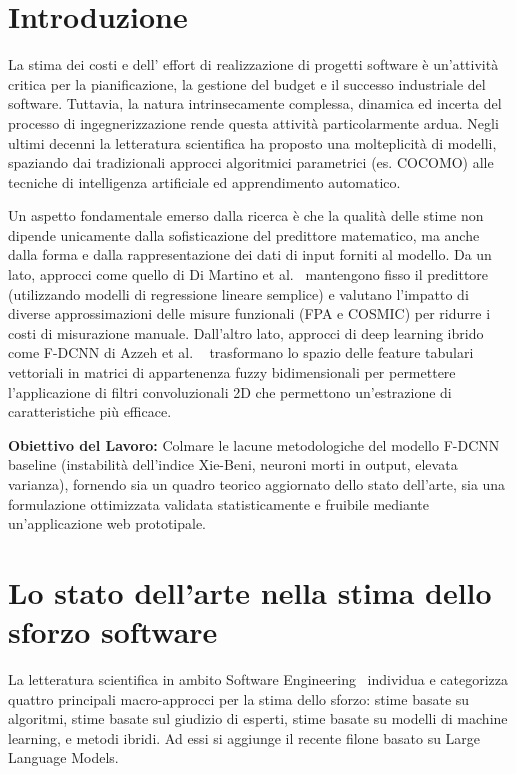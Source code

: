 \documentclass[11pt, a4paper]{article}
\begin{document}
\vspace{1em}

\section{Introduzione}
La stima dei costi e dell' effort di realizzazione di progetti software è
un'attività critica per la pianificazione, la gestione del budget e il successo
industriale del software. Tuttavia, la natura intrinsecamente complessa,
dinamica ed incerta del processo di ingegnerizzazione rende questa attività
particolarmente ardua. Negli ultimi decenni la letteratura scientifica ha
proposto una molteplicità di modelli, spaziando dai tradizionali approcci
algoritmici parametrici (es. COCOMO) alle tecniche di intelligenza artificiale
ed apprendimento automatico.

Un aspetto fondamentale emerso dalla ricerca è che la qualità delle stime non
dipende unicamente dalla sofisticazione del predittore matematico, ma anche
dalla forma e dalla rappresentazione dei dati di input forniti al modello. Da
un lato, approcci come quello di Di Martino et al.~\cite{DIMARTINO2020106308}
mantengono fisso il predittore (utilizzando modelli di regressione lineare
semplice) e valutano l'impatto di diverse approssimazioni delle misure
funzionali (FPA e COSMIC) per ridurre i costi di misurazione manuale.
Dall'altro lato, approcci di deep learning ibrido come F-DCNN di Azzeh et al.
~\cite{article} trasformano lo spazio delle feature tabulari vettoriali in
matrici di appartenenza fuzzy bidimensionali per permettere l'applicazione di
filtri convoluzionali 2D che permettono un'estrazione di caratteristiche più efficace.

\begin{insightbox}
    \textbf{Obiettivo del Lavoro:} Colmare le lacune metodologiche del modello F-DCNN baseline (instabilità dell'indice Xie-Beni, neuroni morti in output, elevata varianza), fornendo sia un quadro teorico aggiornato dello stato dell'arte, sia una formulazione ottimizzata validata statisticamente e fruibile mediante un'applicazione web prototipale.
\end{insightbox}

\section{Lo stato dell'arte nella stima dello sforzo software}\label{sec:stato_arte}
La letteratura scientifica in ambito Software Engineering~\cite{10.1007/978-3-032-04288-0_10, 4027147} individua e categorizza quattro principali macro-approcci per la stima dello sforzo: stime basate su algoritmi, stime basate sul giudizio di esperti, stime basate su modelli di machine learning, e metodi ibridi. Ad essi si aggiunge il recente filone basato su Large Language Models.
\end{document}
